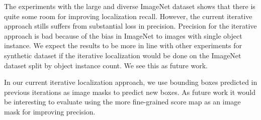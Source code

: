 The experiments with the large and diverse ImageNet dataset shows that there is quite some room for improving localization recall. However, the current iterative approach stills suffers from substantial loss in precision. Precision for the iterative approach is bad because of the bias in ImageNet to images with single object instance. We expect the results to be more in line with other experiments for synthetic dataset if the iterative localization would be done on the ImageNet dataset split by object instance count. We see this as future work.

In our current iterative localization approach, we use bounding boxes predicted in previous iterations as image masks to predict new boxes. As future work it would be interesting to evaluate using the more fine-grained score map as an image mask for improving precision.